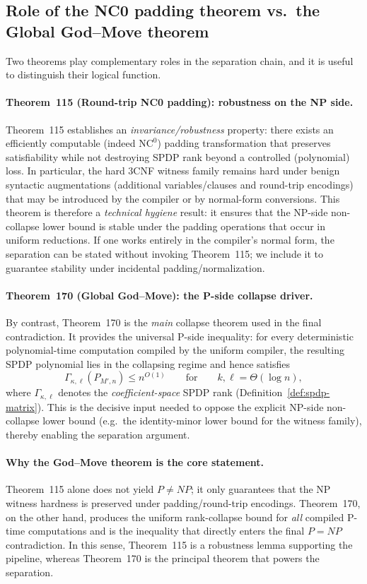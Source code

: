 \documentclass[12pt]{article}
\theoremstyle{definition}
\theoremstyle{definition}
\theoremstyle{remark}
\theoremstyle{remark}
\begin{document}
\subsection{Role of the NC0 padding theorem vs.\ the Global God--Move theorem}
\label{subsec:role-115-vs-170}

Two theorems play complementary roles in the separation chain, and it is
useful to distinguish their logical function.

\paragraph{Theorem~115 (Round-trip NC0 padding): robustness on the NP side.}
Theorem~115 establishes an \emph{invariance/robustness} property: there
exists an efficiently computable (indeed $\mathrm{NC}^0$) padding transformation that
preserves satisfiability while not destroying SPDP rank beyond a controlled
(polynomial) loss. In particular, the hard $3$CNF witness family remains
hard under benign syntactic augmentations (additional variables/clauses and
round-trip encodings) that may be introduced by the compiler or by
normal-form conversions. This theorem is therefore a \emph{technical hygiene}
result: it ensures that the NP-side non-collapse lower bound is stable
under the padding operations that occur in uniform reductions.
If one works entirely in the compiler's normal form, the separation can be stated
without invoking Theorem~115; we include it to guarantee stability under incidental
padding/normalization.

\paragraph{Theorem~170 (Global God--Move): the P-side collapse driver.}
By contrast, Theorem~170 is the \emph{main} collapse theorem used in the final
contradiction. It provides the universal P-side inequality: for every
deterministic polynomial-time computation compiled by the uniform compiler,
the resulting SPDP polynomial lies in the collapsing regime and hence satisfies
\[
\Gamma_{\kappa,\ell}(P_{M',n}) \le n^{O(1)}
\qquad\text{for}\qquad k,\ell=\Theta(\log n),
\]
where $\Gamma_{\kappa,\ell}$ denotes the \emph{coefficient-space} SPDP rank
(Definition~\ref{def:spdp-matrix}).
This is the decisive input needed to oppose the explicit NP-side
non-collapse lower bound (e.g.\ the identity-minor lower bound for the
witness family), thereby enabling the separation argument.

\paragraph{Why the God--Move theorem is the core statement.}
Theorem~115 alone does not yield $P\neq NP$; it only guarantees that the NP witness
hardness is preserved under padding/round-trip encodings.
Theorem~170, on the other hand, produces the
uniform rank-collapse bound for \emph{all} compiled P-time computations and is
the inequality that directly enters the final $P=NP$ contradiction. In this
sense, Theorem~115 is a robustness lemma supporting the pipeline, whereas
Theorem~170 is the principal theorem that powers the separation.
\end{document}
